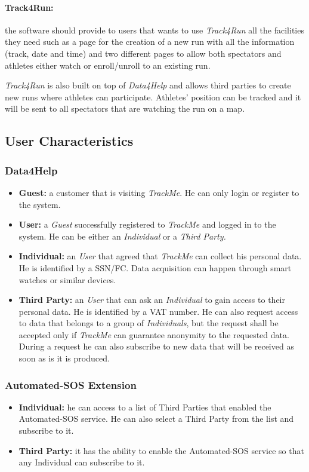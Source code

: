 \documentclass[a4paper]{article}
\begin{document}
    \paragraph{Track4Run: } the software should provide to users that wants to use \textit{Track4Run} all the facilities they need such as a page for the creation of a new run with all the information (track, date and time) and two different pages to allow both spectators and athletes either watch or enroll/unroll to an existing run.
    
    \textit{Track4Run} is also built on top of \textit{Data4Help} and allows third parties to create new runs where athletes can participate. Athletes' position can be tracked and it will be sent to all spectators that are watching the run on a map.
    
    \subsection{User Characteristics}
        \subsubsection{Data4Help}
        \begin{itemize}
            \item \textbf{Guest:} a customer that is visiting \textit{TrackMe}. He can only login or register to the system.
            \item \textbf{User:} a \textit{Guest} successfully registered to \textit{TrackMe} and logged in to the system. He can be either an \textit{Individual} or a \textit{Third Party.}
            \item \textbf{Individual:} an \textit{User} that agreed that \textit{TrackMe} can collect his personal data. He is identified by a SSN/FC. Data acquisition can happen through smart watches or similar devices.
            \item \textbf{Third Party:} an \textit{User} that can ask an \textit{Individual} to gain access to their personal data. He is identified by a VAT number. He can also request access to data that belongs to a group of \textit{Individuals}, but the request shall be accepted only if \textit{TrackMe} can guarantee anonymity to the requested data. During a request he can also subscribe to new data that will be received as soon as is it is produced.
        \end{itemize}

        \subsubsection{Automated-SOS Extension}
        \begin{itemize}
            \item \textbf{Individual:} he can access to a list of Third Parties that enabled the Automated-SOS service. He can also select a Third Party from the list and subscribe to it.
            \item \textbf{Third Party:} it has the ability to enable the Automated-SOS service so that any Individual can subscribe to it.
        \end{itemize}
        
\end{document}
